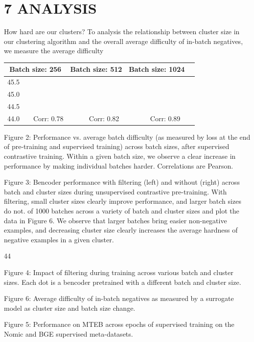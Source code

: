 \section*{7 ANALYSIS}
How hard are our clusters? To analysis the relationship between cluster size in our clustering algorithm and the overall average difficulty of in-batch negatives, we measure the average difficulty

\begin{tabular}{|c|c|c|c|c|c|c|c|c|c|}
\hline \multicolumn{3}{|c|}{ Batch size: 256} & \multicolumn{3}{|c|}{ Batch size: 512} & \multicolumn{3}{|c|}{ Batch size: 1024} \\
\hline 45.5 & & & & & & & & & \\
\hline 45.0 & & & & & & & & & \\
\hline 44.5 & & & & & & & & & \\
\hline 44.0 & & Corr: 0.78 & & & Corr: 0.82 & & & Corr: 0.89 & \\
\hline
\end{tabular}

Figure 2: Performance vs. average batch difficulty (as measured by loss at the end of pre-training and supervised training) across batch sizes, after supervised contrastive training. Within a given batch size, we observe a clear increase in performance by making individual batches harder. Correlations are Pearson.

Figure 3: Bencoder performance with filtering (left) and without (right) across batch and cluster sizes during unsupervised contrastive pre-training. With filtering, small cluster sizes clearly improve performance, and larger batch sizes do not.
of 1000 batches across a variety of batch and cluster sizes and plot the data in Figure 6. We observe that larger batches bring easier non-negative examples, and decreasing cluster size clearly increases the average hardness of negative examples in a given cluster.

44

Figure 4: Impact of filtering during training across various batch and cluster sizes. Each dot is a bencoder pretrained with a different batch and cluster size.

Figure 6: Average difficulty of in-batch negatives as measured by a surrogate model as cluster size and batch size change.

Figure 5: Performance on MTEB across epochs of supervised training on the Nomic and BGE supervised meta-datasets.

